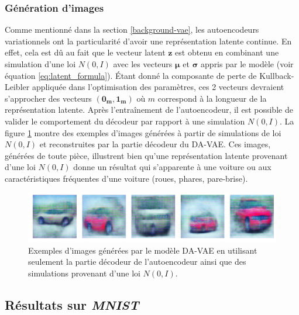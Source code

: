 \subsubsection{Génération d'images}

Comme mentionné dans la section \ref{background-vae}, les autoencodeurs variationnels ont la particularité d'avoir une représentation latente continue. En effet, cela est dû au fait que le vecteur latent $\boldsymbol{z}$ est obtenu en combinant une simulation d'une loi $N(0,I)$ avec les vecteurs $\boldsymbol{\mu}$ et $\boldsymbol{\sigma}$ appris par le modèle (voir équation \ref{eq:latent_formula}). Étant donné la composante de perte de Kullback-Leibler appliquée dans l'optimisation des paramètres, ces 2 vecteurs devraient s'approcher des vecteurs $(\boldsymbol{0_{m}}, \boldsymbol{1_{m}})$ où $m$ correspond à la longueur de la représentation latente. Après l'entraînement de l'autoencodeur, il est possible de valider le comportement du décodeur par rapport à une simulation $N(0,I)$. La figure \ref{fig:generated_cars} montre des exemples d'images générées à partir de simulations de loi $N(0,I)$ et reconstruites par la partie décodeur du DA-VAE. Ces images, générées de toute pièce, illustrent bien qu'une représentation latente provenant d'une loi $N(0,I)$ donne un résultat qui s'apparente à une voiture ou aux caractéristiques fréquentes d'une voiture (roues, phares, pare-brise).

\begin{figure}[htb]
	\centering
	\includegraphics[width=\textwidth]{images/generated_cars}
	\caption{Exemples d'images générées par le modèle DA-VAE en utilisant seulement la partie décodeur de l'autoencodeur ainsi que des simulations provenant d'une loi $N(0,I)$.}
	\label{fig:generated_cars}
\end{figure}

\subsection{Résultats sur \textit{MNIST}}

